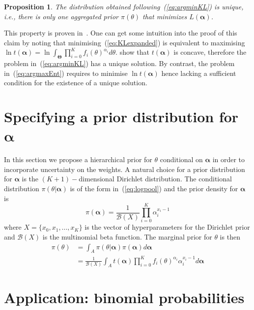 \documentclass[a4paper, notitlepage, 10pt]{article}
\newtheorem{proposition}{Proposition}[]
\begin{document}
\begin{proposition}
\label{prop:uniqueness}
 The distribution obtained following~(\ref{eq:argminKL}) is unique, i.e., there is only one aggregated prior $\pi(\theta)$ that minimizes $L(\boldsymbol\alpha)$.
\end{proposition}
This property is proven in~\cite{rufo2012A}.
One can get some intuition into the proof  of this claim by noting that minimising~(\ref{eq:KLexpanded}) is equivalent to maximising $\ln t(\boldsymbol\alpha) = \ln\int_{\boldsymbol\Theta}\prod_{i=0}^{K}f_i(\theta)^{\alpha_i}d\theta$. 
\cite{rufo2012A} show that $t(\boldsymbol\alpha)$ is concave, therefore the problem in~(\ref{eq:argminKL}) has a unique solution.
By contrast, the problem in~(\ref{eq:argmaxEnt}) requires to minimise $\ln t(\boldsymbol\alpha)$ hence lacking a sufficient condition for the existence of a unique solution.

\section*{Specifying a prior distribution for $\boldsymbol\alpha$}

In this section we propose a hierarchical prior for $\theta$ conditional on $\boldsymbol\alpha$ in order to incorporate uncertainty on the weights.
A natural choice for a prior distribution for $\boldsymbol\alpha$ is the $(K+1)-$dimensional Dirichlet distribution.
The conditional distribution $\pi(\theta|\boldsymbol\alpha)$ is of the form in~(\ref{eq:logpool}) and the prior density for $\boldsymbol\alpha$ is 
\begin{equation}
 \label{eq:generalcondprior}
 \pi(\boldsymbol\alpha) = \frac{1}{\mathcal{B}(X)}\prod_{i=0}^K \alpha_i^{x_i-1}
\end{equation}
where $X = \{ x_0, x_1, \ldots, x_K\}$ is the vector of hyperparameters for the Dirichlet prior and $\mathcal{B}(X)$ is the multinomial beta function.
The marginal prior for $\theta$ is then
\begin{align}
 \label{eq:marginalhierprior}
 \pi(\theta) &= \int_{A}\pi(\theta|\boldsymbol\alpha)\pi(\boldsymbol\alpha)d\boldsymbol\alpha \\
             &= \frac{1}{\mathcal{B}(X)}\int_{A}t(\boldsymbol\alpha)\prod_{i=0}^K f_i(\theta)^{\alpha_i}\alpha_i^{x_i-1}d\boldsymbol\alpha 
\end{align}

\section*{Application: binomial probabilities}
\end{document}

